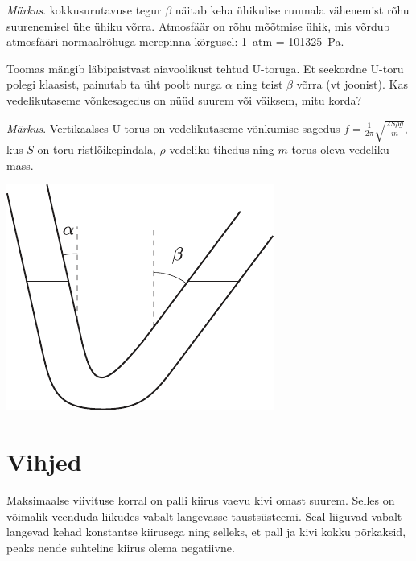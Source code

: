 \documentclass[10pt]{article}
\begin{document}
{\emph{Märkus}. kokkusurutavuse tegur $\beta$ näitab keha ühikulise ruumala vähenemist rõhu suurenemisel ühe ühiku võrra. Atmosfäär on rõhu mõõtmise ühik, mis võrdub atmosfääri normaalrõhuga merepinna kõrgusel: \SI{1}{atm} = \SI{101325}{Pa}.
\probend
\bigskip


Toomas mängib läbipaistvast aiavoolikust tehtud U-toruga. Et seekordne U-toru polegi klaasist, painutab ta üht poolt nurga $\alpha$ ning teist $\beta$ võrra (vt joonist). Kas vedelikutaseme võnkesagedus on nüüd suurem või väiksem, mitu korda? 

\emph{Märkus}. Vertikaalses U-torus on vedelikutaseme võnkumise sagedus $f = \frac{1}{2\pi} \sqrt{\frac{2S\rho g}{m}}$, kus $S$ on toru ristlõikepindala, $\rho$ vedeliku tihedus ning $m$ torus oleva vedeliku mass.

\begin{center}
	\includegraphics[width=0.5\linewidth]{2008-v3g-08-yl}
\end{center}
\probend
\bigskip
\newpage\normalsize\section{Vihjed}
        \toggleHint
        

\hint
Maksimaalse viivituse korral on palli kiirus vaevu kivi omast suurem. Selles on võimalik veenduda liikudes vabalt langevasse taustsüsteemi. Seal liiguvad vabalt langevad kehad konstantse kiirusega ning selleks, et pall ja kivi kokku põrkaksid, peaks nende suhteline kiirus olema negatiivne.
\probend
\bigskip


}
\end{document}
